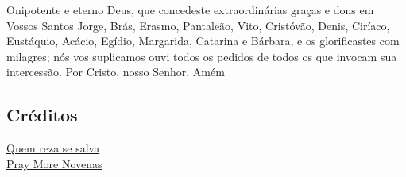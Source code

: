 \documentclass[a4paper,12pt]{extarticle} \usepackage[utf8]{inputenc}
\begin{document}
 

Onipotente e eterno Deus, que concedeste extraordinárias graças e dons em Vossos Santos Jorge, Brás, Erasmo, Pantaleão, Vito, Cristóvão, Denis, Ciríaco, Eustáquio, Acácio, Egídio, Margarida, Catarina e Bárbara, e os glorificastes com milagres; nós vos suplicamos ouvi todos os pedidos de todos os que invocam sua intercessão. Por Cristo, nosso Senhor. Amém



\vfill

\begin{center}
\subsection*{Créditos}
\href{https://quemrezasesalva.com.br/devocao/ladainha-dos-catorze-santos-auxiliares}{Quem reza se salva}\\
\href{https://www.praymorenovenas.com/14-holy-helpers-novena}{Pray More Novenas}\\ 
\end{center}
\end{document}
